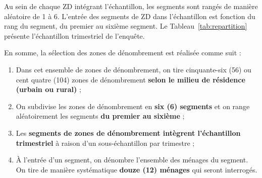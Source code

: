 \documentclass[12pt, a4paper]{article}
\begin{document}
Au sein de chaque ZD intégrant l'échantillon, les segments sont rangés de manière aléatoire de 1 à 6. L'entrée des segments de ZD dans l'échantillon est fonction du rang du segment, du premier au sixième segment. Le Tableau~\ref{tab:repartition} présente l'échantillon trimestriel de l'enquête.

En somme, la sélection des zones de dénombrement est réalisée comme suit :
\begin{enumerate}[label=(\roman*), noitemsep]
  \item Dans cet ensemble de zones de dénombrement, on tire cinquante-six (56) ou cent quatre (104) zones de dénombrement \textbf{selon le milieu de résidence (urbain ou rural)} ;
  \item On subdivise les zones de dénombrement en \textbf{six (6) segments} et on range aléatoirement les segments \textbf{du premier au sixième} ;
  \item Les \textbf{segments de zones de dénombrement intègrent l'échantillon trimestriel} à raison d'un sous-échantillon par trimestre ;
  \item À l'entrée d'un segment, on dénombre l'ensemble des ménages du segment. On tire de manière systématique \textbf{douze (12) ménages} qui seront interrogés.
\end{enumerate}
\end{document}
